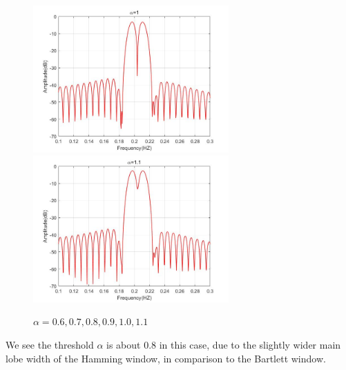 \documentclass[UTF-8, a4paper, 12pt]{ctexart}
\begin{document}
\begin{figure}[htbp]
    \includegraphics[width=7.5cm]{2/ham10.jpg}
    \includegraphics[width=7.5cm]{2/ham11.jpg}
    \caption{$\alpha= 0.6, 0.7, 0.8, 0.9, 1.0,1.1$}
\end{figure}

We see the threshold $\alpha $ is about 0.8 in this case, due to the slightly wider main lobe width
of the Hamming window, in comparison to the Bartlett window.
\end{document}
